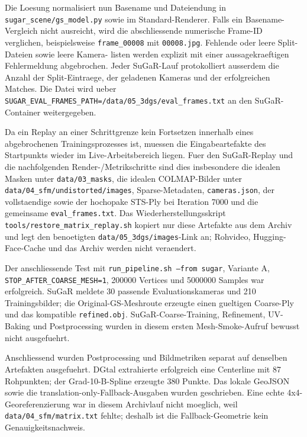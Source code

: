 \documentclass[12pt,a4paper]{article}
\begin{document}
Die Loesung normalisiert nun Basename und Dateiendung in
\texttt{sugar\_scene/gs\_model.py} sowie im Standard-Renderer. Falls ein
Basename-Vergleich nicht ausreicht, wird die abschliessende numerische
Frame-ID verglichen, beispielsweise \texttt{frame\_00008} mit
\texttt{00008.jpg}. Fehlende oder leere Split-Dateien sowie leere Kamera-
listen werden explizit mit einer aussagekraeftigen Fehlermeldung abgebrochen.
Jeder SuGaR-Lauf protokolliert ausserdem die Anzahl der Split-Eintraege, der
geladenen Kameras und der erfolgreichen Matches. Die Datei wird ueber
\texttt{SUGAR\_EVAL\_FRAMES\_PATH=/data/05\_3dgs/eval\_frames.txt} an den
SuGaR-Container weitergegeben.

Da ein Replay an einer Schrittgrenze kein Fortsetzen innerhalb eines
abgebrochenen Trainingsprozesses ist, muessen die Eingabeartefakte des
Startpunkts wieder im Live-Arbeitsbereich liegen. Fuer den SuGaR-Replay und
die nachfolgenden Render-/Metrikschritte sind dies insbesondere die idealen
Masken unter \texttt{data/03\_masks}, die idealen COLMAP-Bilder unter
\texttt{data/04\_sfm/undistorted/images}, Sparse-Metadaten,
\texttt{cameras.json}, der vollstaendige sowie der hochopake STS-Ply bei
Iteration 7000 und die gemeinsame \texttt{eval\_frames.txt}. Das
Wiederherstellungsskript
\texttt{tools/restore\_matrix\_replay.sh} kopiert nur diese Artefakte aus dem
Archiv und legt den benoetigten \texttt{data/05\_3dgs/images}-Link an; Rohvideo,
Hugging-Face-Cache und das Archiv werden nicht veraendert.

Der anschliessende Test mit \texttt{run\_pipeline.sh --from sugar}, Variante A,
\texttt{STOP\_AFTER\_COARSE\_MESH=1}, 200000 Vertices und 5000000 Samples war
erfolgreich. SuGaR meldete 30 passende Evaluationskameras und 210
Trainingsbilder; die Original-GS-Meshroute erzeugte einen gueltigen Coarse-Ply
und das kompatible \texttt{refined.obj}. SuGaR-Coarse-Training, Refinement,
UV-Baking und Postprocessing wurden in diesem ersten Mesh-Smoke-Aufruf bewusst
nicht ausgefuehrt.

Anschliessend wurden Postprocessing und Bildmetriken separat auf denselben
Artefakten ausgefuehrt. DGtal extrahierte erfolgreich eine Centerline mit 87
Rohpunkten; der Grad-10-B-Spline erzeugte 380 Punkte. Das lokale GeoJSON sowie
die translation-only-Fallback-Ausgaben wurden geschrieben. Eine echte
4x4-Georeferenzierung war in diesem Archivlauf nicht moeglich, weil
\texttt{data/04\_sfm/matrix.txt} fehlte; deshalb ist die Fallback-Geometrie
kein Genauigkeitsnachweis.
\end{document}
